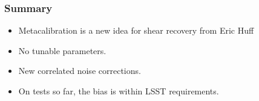 \documentclass{beamer}
\begin{document}
\frame
{
    \frametitle{Summary}

 
    \begin{itemize}
        \item Metacalibration is a new idea for shear recovery from
            Eric Huff

        \item No tunable parameters.

        \item New correlated noise corrections.

        \item On tests so far, the bias is within LSST requirements.
        
    \end{itemize}

}
\end{document}

